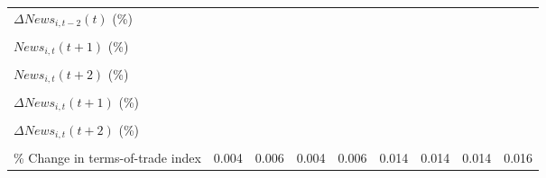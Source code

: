 {\begin{tabular}{l*{8}{c}}
\addlinespace
$ \Delta News_{i,t-2}(t)$ (\%)&                     &                     &                     &                     &                     &                     &                     &                     \\
                    &                     &                     &                     &                     &                     &                     &                     &                     \\
\addlinespace
$ News_{i,t}(t+1)$ (\%)&                     &                     &                     &                     &                     &                     &                     &                     \\
                    &                     &                     &                     &                     &                     &                     &                     &                     \\
\addlinespace
$ News_{i,t}(t+2)$ (\%)&                     &                     &                     &                     &                     &                     &                     &                     \\
                    &                     &                     &                     &                     &                     &                     &                     &                     \\
\addlinespace
$ \Delta News_{i,t}(t+1)$ (\%)&                     &                     &                     &                     &                     &                     &                     &                     \\
                    &                     &                     &                     &                     &                     &                     &                     &                     \\
\addlinespace
$ \Delta News_{i,t}(t+2)$ (\%)&                     &                     &                     &                     &                     &                     &                     &                     \\
                    &                     &                     &                     &                     &                     &                     &                     &                     \\
\addlinespace
\% Change in terms-of-trade index&       0.004         &       0.006         &       0.004         &       0.006         &       0.014         &       0.014         &       0.014         &       0.016         \\

\end{tabular}}
